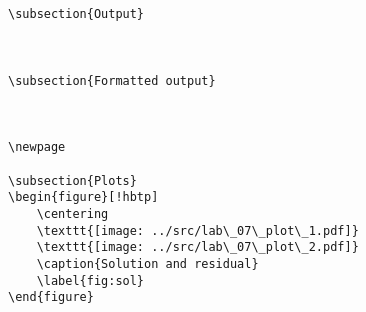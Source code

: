 \begin{verbatim}
\subsection{Output}



\subsection{Formatted output}



\newpage

\subsection{Plots}
\begin{figure}[!hbtp]
    \centering
    \texttt{[image: ../src/lab\_07\_plot\_1.pdf]}
    \texttt{[image: ../src/lab\_07\_plot\_2.pdf]}
    \caption{Solution and residual}
    \label{fig:sol}
\end{figure}
\end{verbatim}
